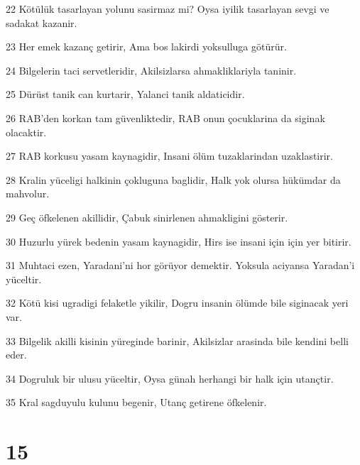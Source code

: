 \par 22 Kötülük tasarlayan yolunu sasirmaz mi? Oysa iyilik tasarlayan sevgi ve sadakat kazanir.
\par 23 Her emek kazanç getirir, Ama bos lakirdi yoksulluga götürür.
\par 24 Bilgelerin taci servetleridir, Akilsizlarsa ahmakliklariyla taninir.
\par 25 Dürüst tanik can kurtarir, Yalanci tanik aldaticidir.
\par 26 RAB'den korkan tam güvenliktedir, RAB onun çocuklarina da siginak olacaktir.
\par 27 RAB korkusu yasam kaynagidir, Insani ölüm tuzaklarindan uzaklastirir.
\par 28 Kralin yüceligi halkinin çokluguna baglidir, Halk yok olursa hükümdar da mahvolur.
\par 29 Geç öfkelenen akillidir, Çabuk sinirlenen ahmakligini gösterir.
\par 30 Huzurlu yürek bedenin yasam kaynagidir, Hirs ise insani için için yer bitirir.
\par 31 Muhtaci ezen, Yaradani'ni hor görüyor demektir. Yoksula aciyansa Yaradan'i yüceltir.
\par 32 Kötü kisi ugradigi felaketle yikilir, Dogru insanin ölümde bile siginacak yeri var.
\par 33 Bilgelik akilli kisinin yüreginde barinir, Akilsizlar arasinda bile kendini belli eder.
\par 34 Dogruluk bir ulusu yüceltir, Oysa günah herhangi bir halk için utançtir.
\par 35 Kral sagduyulu kulunu begenir, Utanç getirene öfkelenir.

\chapter{15}

